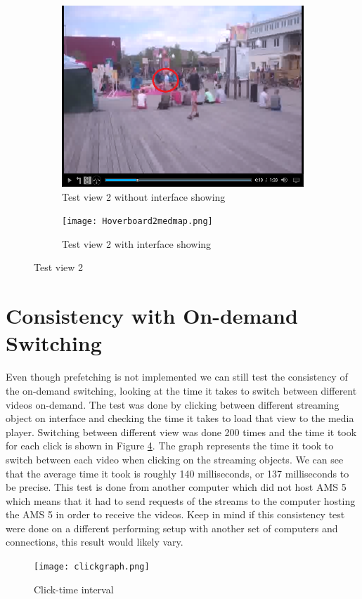 \begin{figure}
\begin{subfigure}[b]{0.5\textwidth}
 	\includegraphics[width=\linewidth]{Hoverboard_2.png}
  	\caption{Test view 2 without interface showing}\label{fig:testview2A}
    \end{subfigure}\hfill 
    \hspace{3px}
    \begin{subfigure}[b]{0.5\textwidth}
	 \texttt{[image: Hoverboard2medmap.png]}
 	\caption{Test view 2 with interface showing}\label{fig:testview2B}
    \end{subfigure}
	\caption{Test view 2}
	\label{fig:testview2}
\end{figure}

\section{Consistency with On-demand Switching}
Even though prefetching is not implemented we can still test the consistency of the on-demand switching, looking at the time it takes to switch between different videos on-demand. The test was done by clicking between different streaming object on interface and checking the time it takes to load that view to the media player. Switching between different view was done 200 times and the time it took for each click is shown in Figure \ref{fig:clickgraph}. The graph represents the time it took to switch between each video when clicking on the streaming objects. We can see that the average time it took is roughly 140 milliseconds, or 137 milliseconds to be precise. This test is done from another computer which did not host AMS 5 which means that it had to send requests of the streams to the computer hosting the AMS 5 in order to receive the videos. Keep in mind if this consistency test were done on a different performing setup with another set of computers and connections, this result would likely vary.


\begin{figure}[ht!]
\begin{center}
	\texttt{[image: clickgraph.png]}
	\caption{Click-time interval}
	\label{fig:clickgraph}
\end{center}
\end{figure}